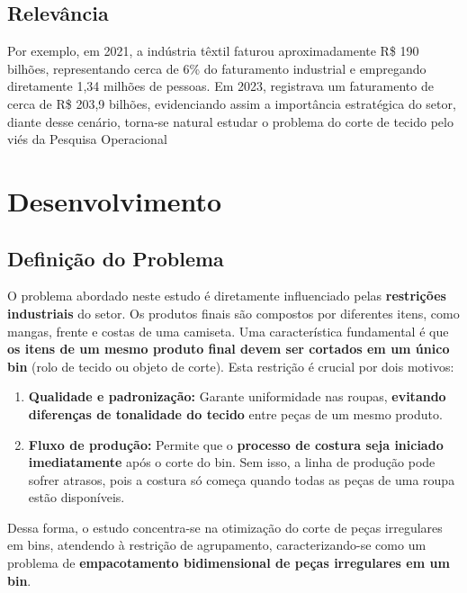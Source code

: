\documentclass[a4paper, 12pt]{article}
\begin{document}
\subsection{Relevância}

Por exemplo, em 2021, a indústria têxtil faturou aproximadamente R\$ 190 bilhões, representando cerca de 6\% do faturamento industrial e empregando diretamente 1,34 milhões de pessoas. Em 2023, registrava um faturamento de cerca de R\$ 203{,}9 bilhões, evidenciando assim a importância estratégica do setor, diante desse cenário, torna-se natural estudar o problema do corte de tecido pelo viés da Pesquisa Operacional


\section{Desenvolvimento}
\label{sec:defprob}

\subsection{Definição do Problema} 

O problema abordado neste estudo é diretamente influenciado pelas \textbf{restrições industriais} do setor. Os produtos finais são compostos por diferentes itens, como mangas, frente e costas de uma camiseta. Uma característica fundamental é que \textbf{os itens de um mesmo produto final devem ser cortados em um único bin} (rolo de tecido ou objeto de corte). Esta restrição é crucial por dois motivos:
\begin{enumerate}
    \item \textbf{Qualidade e padronização:} Garante uniformidade nas roupas, \textbf{evitando diferenças de tonalidade do tecido} entre peças de um mesmo produto.
    \item \textbf{Fluxo de produção:} Permite que o \textbf{processo de costura seja iniciado imediatamente} após o corte do bin. Sem isso, a linha de produção pode sofrer atrasos, pois a costura só começa quando todas as peças de uma roupa estão disponíveis.
\end{enumerate}

Dessa forma, o estudo concentra-se na otimização do corte de peças irregulares em bins, atendendo à restrição de agrupamento, caracterizando-se como um problema de \textbf{empacotamento bidimensional de peças irregulares em um bin}.
\end{document}
